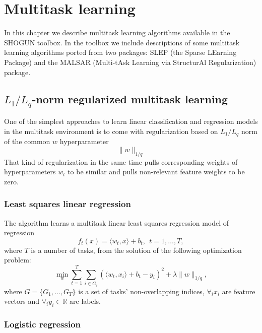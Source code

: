 %

\chapter{Multitask learning}

In this chapter we describe multitask learning algorithms available in the SHOGUN toolbox. 
In the toolbox we include descriptions of some multitask learning algorithms 
ported from two packages: SLEP (the Sparse LEarning Package) and the MALSAR 
(Multi-tAsk Learning via StructurAl Regularization) package.

\section{$L_1/L_q$-norm regularized multitask learning}

One of the simplest approaches to learn linear classification and regression models in the 
multitask environment is to come with regularization based on $L_1/L_q$ norm 
of the common $w$ hyperparameter
$$
\| w \|_{1/q}
$$ 
That kind of regularization in the same time pulls corresponding weights 
of hyperparameters $w_t$ to be similar and pulls non-relevant feature weights
to be zero.

\subsection{Least squares linear regression}

The algorithm learns a multitask linear least squares regression model of regression 
$$
f_t(x) = \langle w_t,x \rangle + b_t, ~~ t = 1, \dots, T,
$$
where $T$ is a number of tasks, from the solution of the following optimization problem:
$$
\min_w \sum_{t=1}^{T} \sum_{i \in G_t} \left(\langle w_t,x_i \rangle + b_t - y_i\right)^2
+ \lambda \| w \|_{1/q},
$$
where $G = \{ G_1, \dots, G_T \}$ is a set of tasks' non-overlapping indices, $\forall_i x_i$ are feature 
vectors and $\forall_i y_i \in \mathbb{R}$ are labels.

\subsection{Logistic regression}

